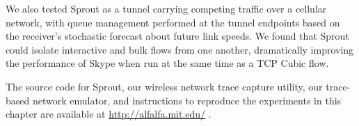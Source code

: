 
%

We also tested Sprout as a tunnel carrying competing traffic over a
cellular network, with queue management performed at the tunnel
endpoints based on the receiver's stochastic forecast about future
link speeds. We found that Sprout could isolate interactive and bulk
flows from one another, dramatically improving the performance of
Skype when run at the same time as a TCP Cubic flow.

The source code for Sprout, our wireless network trace capture
utility, our trace-based network emulator, and instructions to
reproduce the experiments in this chapter are available at
\url{http://alfalfa.mit.edu/} .
